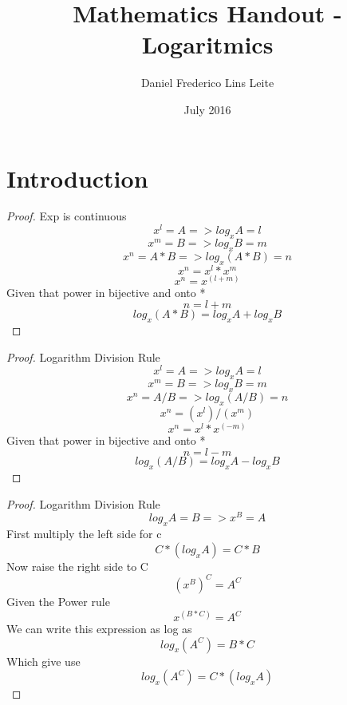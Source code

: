 \documentclass{article}
\title{Mathematics Handout - Logaritmics}
\author{Daniel Frederico Lins Leite}
\date{July 2016}
\begin{document}
\section{Introduction}
\maketitle
\begin{proof}{Exp is continuous}
\[x^l = A => log_x A = l\]
\[x^m = B => log_x B = m\]      
\[x^n = A*B => log_x(A*B) = n\]
\[x^n = x^l*x^m\]
\[x^n = x^(l+m)\]
Given that power in bijective and onto *
\[n = l+m\]
\[log_x (A*B) = log_x A + log_x B\]
\end{proof}
\begin{proof}{Logarithm Division Rule}
\[x^l = A => log_x A = l\]
\[x^m = B => log_x B = m\]      
\[x^n = A/B => log_x(A/B) = n\]
\[x^n = (x^l)/(x^m)\]
\[x^n = x^l*x^(-m)\]
Given that power in bijective and onto *
\[n=l-m\]
\[log_x (A/B) = log_x A - log_x B\]
\end{proof}
\begin{proof}{Logarithm Division Rule}
\[log_x A = B => x^B = A\]
First multiply the left side for c
\[C*(log_x A) = C*B\]
Now  raise the right side to C
\[(x^B)^C =  A^C\]
Given the Power rule
\[x^(B*C) = A^C\]
We can write this expression as log as
\[log_x (A^C) = B*C\]
Which give use
\[log_x (A^C) = C*(log_x A)\]
\end{proof}
\end{document}
